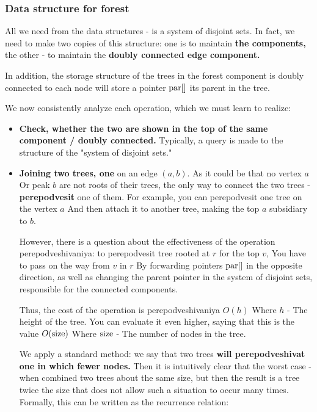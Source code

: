 \subsubsection{ Data structure for forest }

All we need from the data structures - is a system of disjoint sets. In fact, we need to make two copies of this structure: one is to maintain \textbf{the components,} the other - to maintain the \textbf{doubly connected edge component.}

In addition, the storage structure of the trees in the forest component is doubly connected to each node will store a pointer ${\rm par} []$ its parent in the tree.

We now consistently analyze each operation, which we must learn to realize:

\begin{itemize}

\item \textbf{Check, whether the two are shown in the top of the same component / doubly connected.} Typically, a query is made to the structure of the "system of disjoint sets."

\item \textbf{Joining two trees, one} on an edge $(a, b)$. As it could be that no vertex $a$ Or peak $b$ are not roots of their trees, the only way to connect the two trees - \textbf{perepodvesit} one of them. For example, you can perepodvesit one tree on the vertex $a$ And then attach it to another tree, making the top $a$ subsidiary to $b$.

However, there is a question about the effectiveness of the operation perepodveshivaniya: to perepodvesit tree rooted at $r$ for the top $v$, You have to pass on the way from $v$ in $r$ By forwarding pointers ${\rm par} []$ in the opposite direction, as well as changing the parent pointer in the system of disjoint sets, responsible for the connected components.

Thus, the cost of the operation is perepodveshivaniya $O (h)$ Where $h$ - The height of the tree. You can evaluate it even higher, saying that this is the value $O ({\rm size})$ Where $\rm size$ - The number of nodes in the tree.

We apply a standard method: we say that two trees \textbf{will perepodveshivat one in which fewer nodes.} Then it is intuitively clear that the worst case - when combined two trees about the same size, but then the result is a tree twice the size that does not allow such a situation to occur many times. Formally, this can be written as the recurrence relation:


\end{itemize}
